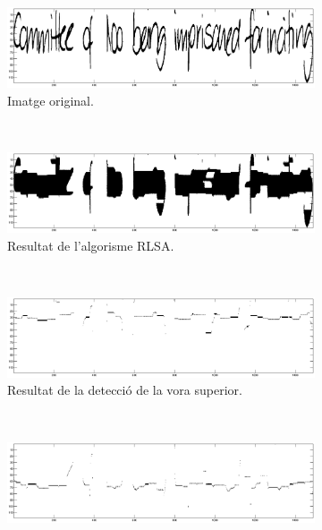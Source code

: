 \begin{figure}
\centering
\begin{subfigure}[b]{0.8\textwidth}
\centering
\includegraphics[width=\textwidth]{images/pasos_segmentacio_heuristica_original.eps}
\caption{Imatge original.}\label{fig:pasos_segmentacio_heuristica_original}
\end{subfigure} \\
\begin{subfigure}[b]{0.8\textwidth}
\centering
\includegraphics[width=\textwidth]{images/pasos_segmentacio_heuristica_rlsa.eps}
\caption{Resultat de l'algorisme RLSA.}\label{fig:pasos_segmentacio_heuristica_rlsa}
\end{subfigure}\\
\begin{subfigure}[b]{0.8\textwidth}
\centering
\includegraphics[width=\textwidth]{images/pasos_segmentacio_heuristica_vora_superior.eps}
\caption{Resultat de la detecció de la vora superior.}\label{fig:pasos_segmentacio_heuristica_sup}
\end{subfigure}\\
\begin{subfigure}[b]{0.8\textwidth}
\centering
\includegraphics[width=\textwidth]{images/pasos_segmentacio_heuristica_vora_inferior.eps}

\end{subfigure}
\end{figure}
